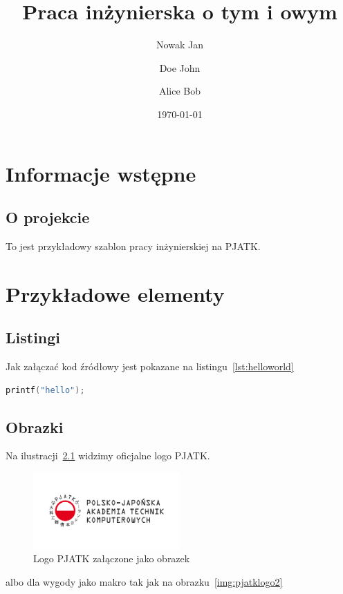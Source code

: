 \documentclass{sprz}
\title{Praca inżynierska o tym i owym}
\author{Nowak Jan}{s1234}
\author{Doe John}{s1222}
\author{Alice Bob}{s1299}
\date{\today}
\begin{document}
\maketitle

\tableofcontents

\chapter{Informacje wstępne}



\section{O projekcie}

To jest przykładowy szablon pracy inżynierskiej na PJATK.

\chapter{Przykładowe elementy}

\section{Listingi}

Jak załączać kod źródłowy jest pokazane na listingu~\ref{lst:helloworld}


\begin{lstlisting}[language=c,caption={Przykładowy witaj w świecie}, label={lst:helloworld}]
printf("hello");
\end{lstlisting}

\section{Obrazki}

Na ilustracji~\ref{img:pjatklogo} widzimy oficjalne logo PJATK.

\begin{figure}[h]
    \centering
    \includegraphics[width=0.5\textwidth]{sprz/pjatk}
    \caption{Logo PJATK załączone jako obrazek}
    \label{img:pjatklogo}
\end{figure}

albo dla wygody jako makro tak jak na obrazku~\ref{img:pjatklogo2}



\printbibliography[title={Bibliografia}]
\end{document}
